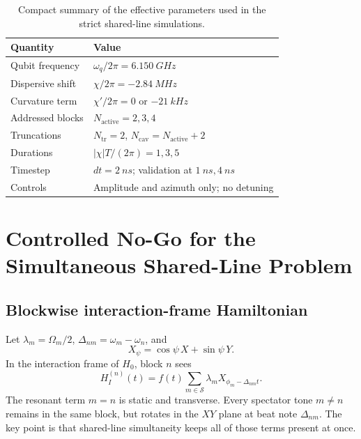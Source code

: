 \documentclass[aps,pra,twocolumn,reprint,floatfix,amsmath,amssymb]{revtex4-2}
\begin{document}
\begin{table}[tb]
  \centering
  \small
  \caption{Compact summary of the effective parameters used in the strict shared-line simulations.}
  \label{tab:methodparams}
  \begin{tabular}{@{}ll@{}}
    \toprule
    Quantity & Value \\
    \midrule
    Qubit frequency & \(\omega_q/2\pi = \SI{6.150}{GHz}\) \\
    Dispersive shift & \(\chi/2\pi = \SI{-2.84}{MHz}\) \\
    Curvature term & \(\chi'/2\pi = 0\) or \(\SI{-21}{kHz}\) \\
    Addressed blocks & \(N_{\mathrm{active}} = 2, 3, 4\) \\
    Truncations & \(N_{\mathrm{tr}} = 2\), \(N_{\mathrm{cav}} = N_{\mathrm{active}} + 2\) \\
    Durations & \(|\chi|T/(2\pi) = 1, 3, 5\) \\
    Timestep & \(dt = \SI{2}{ns}\); validation at \(\SI{1}{ns}, \SI{4}{ns}\) \\
    Controls & Amplitude and azimuth only; no detuning \\
    \bottomrule
  \end{tabular}
\end{table}

\section{Controlled No-Go for the Simultaneous Shared-Line Problem}
\label{sec:nogo}

\subsection{Blockwise interaction-frame Hamiltonian}

Let \(\lambda_m = \Omega_m/2\), \(\Delta_{nm} = \omega_m - \omega_n\), and
\begin{equation}
X_{\psi} = \cos\psi\,X + \sin\psi\,Y.
\end{equation}
In the interaction frame of \(H_0\), block \(n\) sees
\begin{equation}
H_{I}^{(n)}(t)
= f(t)\sum_{m \in \mathcal{S}} \lambda_m X_{\phi_m-\Delta_{nm} t}.
\label{eq:blockHI}
\end{equation}
The resonant term \(m=n\) is static and transverse. Every spectator tone \(m \neq n\) remains in the same block, but rotates in the \(XY\) plane at beat note \(\Delta_{nm}\). The key point is that shared-line simultaneity keeps all of those terms present at once.
\end{document}
